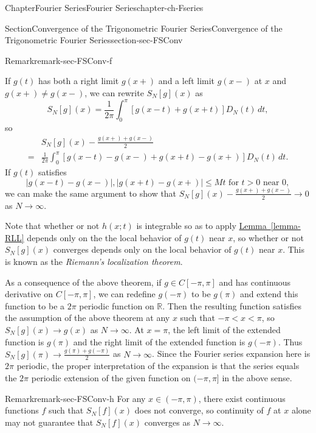 \documentclass[oneside,10pt,]{book}
\newcommand{\xreffont}{\relax}
\numberwithin{equation}{section}
\newcommand{\bbR}{\mathbb{R}}
\newcommand{\lt}{<}
\newcommand{\amp}{&}
\begin{document}
\begin{chapterptx}{Chapter}{Fourier Series}{}{Fourier Series}{}{}{chapter-ch-Fseries}
\begin{sectionptx}{Section}{Convergence of the Trigonometric Fourier Series}{}{Convergence of the Trigonometric Fourier Series}{}{}{section-sec-FSConv}
\begin{remark}{Remark}{}{remark-sec-FSConv-f}
\par
If \(g(t)\) has both a right limit \(g(x+)\) and a left limit \(g(x-)\) at \(x\) and \(g(x+)\ne g(x-)\), we can rewrite \(S_N[g]( x)\) as%
\begin{equation*}
S_N[g]( x)= \frac{1}{2\pi} \int_{0}^{\pi}\left[ g(x-t)+g(x+t)\right] D_{N}(t)\, dt,
\end{equation*}
so%
\begin{align*}
\amp S_N[g]( x)-\frac{g(x+)+g(x-)}{2}\\
= \amp \frac{1}{2\pi} \int_{0}^{\pi}\left[ g(x-t)-g(x-)+g(x+t)-g(x+)\right] D_{N}(t)\, dt.
\end{align*}
If \(g(t)\) satisfies%
\begin{equation*}
\vert g(x-t)-g(x-) \vert, \vert g(x+t)-g(x+)\vert \le M t\text{ for $t>0$ near $0$},
\end{equation*}
we can make the same argument to show that \(S_N[g]( x)-\frac{g(x+)+g(x-)}{2}\to 0\) as \(N\to\infty\).%
\par
Note that whether or not  \(h(x; t)\) is integrable so as to apply  \hyperref[lemma-RLL]{Lemma~{\xreffont\ref{lemma-RLL}}} depends only on the the local behavior of \(g(t)\) near \(x\), so whether or not \(S_N[g]( x)\) converges depends only on the local behavior of \(g(t)\) near \(x\). This is known as the \emph{Riemann's localization theorem}.%
\end{remark}
As a consequence	of the above theorem, if \(g\in C[-\pi, \pi]\) and has continuous derivative on \(C[-\pi, \pi]\), we can redefine \(g(-\pi)\) to be \(g(\pi)\) and extend this function to be a \(2\pi\) periodic function on \(\bbR\). Then the resulting function satisfies the assumption of the above theorem at any \(x\) such that \(-\pi \lt x \lt \pi\), so \(S_N[g]( x)\to g(x)\) as \(N\to \infty\). At \(x=\pi\), the left limit of the extended function is \(g(\pi)\) and the right limit  of the extended function is \(g(-\pi)\). Thus \(S_N[g]( \pi)\to \frac{g(\pi)+g(-\pi)}{2}\) as \(N\to \infty\). Since the Fourier series expansion here is \(2\pi\) periodic, the proper interpretation of the expansion is that the series equals the \(2\pi\) periodic extension of the given function on \((-\pi, \pi]\) in the above sense.%
\begin{remark}{Remark}{}{remark-sec-FSConv-h}%
For any \(x\in (-\pi, \pi)\), there exist continuous functions \(f\) such that \(S_N[f](x)\) does not converge, so continuity of \(f\) at \(x\) alone may not guarantee that \(S_N[f]( x)\) converges as \(N\to\infty\).%
\par

\end{remark}
\end{sectionptx}
\end{chapterptx}
\end{document}
